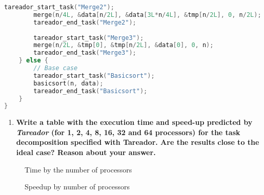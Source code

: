 \documentclass[a4paper]{article}
\newenvironment{questionenum}{%
\setlist[enumerate]{resume}
\restartlist{enumerate}
\newcommand{\question}[1]{
\begin{enumerate}
	\item\bfseries ##1
\end{enumerate}
}}{%
}
\begin{document}
\begin{questionenum}
\begin{lstlisting}[language=C]
		tareador_start_task("Merge2");
		merge(n/4L, &data[n/2L], &data[3L*n/4L], &tmp[n/2L], 0, n/2L);
		tareador_end_task("Merge2");
		
		tareador_start_task("Merge3");
		merge(n/2L, &tmp[0], &tmp[n/2L], &data[0], 0, n);
		tareador_end_task("Merge3");
	} else {
		// Base case
		tareador_start_task("Basicsort");
		basicsort(n, data);
		tareador_end_task("Basicsort");
	}
}
\end{lstlisting}
	
	\question{Write a table with the execution time and speed-up predicted by \textit{Tareador} (for 1, 2, 4, 8, 16, 32 and 64 processors) for the task decomposition specified with Tareador. Are the results close to the ideal case? Reason about your answer.}
	
	\begin{figure}[H]
		\centering
		\begin{minipage}[t]{0.49\textwidth}
			\caption{Time by the number of processors}
		\end{minipage}
		\hfill
		\begin{minipage}[t]{0.49\textwidth}
			\caption{Speedup by number of processors}
		\end{minipage}
	\end{figure}
\end{questionenum}
\end{document}
